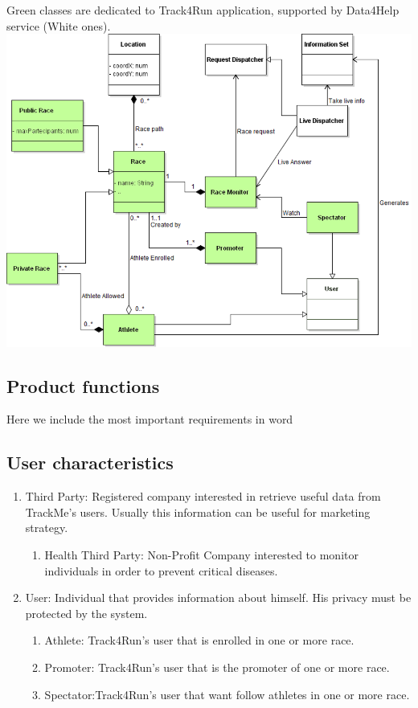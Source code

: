 \begin{center}
{\color{LimeGreen} Green classes} are dedicated to {\color{LimeGreen} Track4Run} application, supported by Data4Help service (White ones).
\includegraphics[scale=0.5]{Images/Class_Track4Run.png}
\end{center}


\subsection{Product functions}
Here we include the most important requirements in word

\subsection{User characteristics}
\begin{enumerate}
\item Third Party: Registered company interested in retrieve useful data from TrackMe's users. Usually this information can be useful for marketing strategy.
	\begin{enumerate}
		\item Health Third Party: Non-Profit Company interested to monitor 		individuals in order to prevent critical diseases. 
	\end{enumerate}
\item User: Individual that provides information about himself. His privacy must be protected by the system.
	\begin{enumerate}
		\item Athlete: Track4Run's user that is enrolled in one or more race.
		\item Promoter: Track4Run's user that is the promoter of one or more race.
		\item Spectator:Track4Run's user that want follow athletes in one or more race.
	\end{enumerate}
\end{enumerate}

